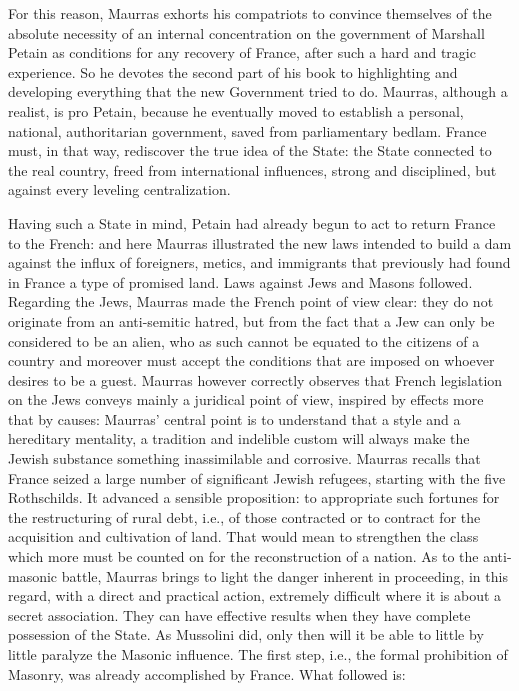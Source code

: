 For this reason, Maurras exhorts his compatriots to convince themselves of the absolute necessity of an internal concentration on the government of Marshall Petain as conditions for any recovery of France, after such a hard and tragic experience. So he devotes the second part of his book to highlighting and developing everything that the new Government tried to do. Maurras, although a realist, is pro Petain, because he eventually moved to establish a personal, national, authoritarian government, saved from parliamentary bedlam. France must, in that way, rediscover the true idea of the State: the State connected to the real country, freed from international influences, strong and disciplined, but against every leveling centralization.

Having such a State in mind, Petain had already begun to act to return France to the French: and here Maurras illustrated the new laws intended to build a dam against the influx of foreigners, metics, and immigrants that previously had found in France a type of promised land. Laws against Jews and Masons followed. Regarding the Jews, Maurras made the French point of view clear: they do not originate from an anti-semitic hatred, but from the fact that a Jew can only be considered to be an alien, who as such cannot be equated to the citizens of a country and moreover must accept the conditions that are imposed on whoever desires to be a guest. Maurras however correctly observes that French legislation on the Jews conveys mainly a juridical point of view, inspired by effects more that by causes: Maurras' central point is to understand that a style and a hereditary mentality, a tradition and indelible custom will always make the Jewish substance something inassimilable and corrosive. Maurras recalls that France seized a large number of significant Jewish refugees, starting with the five Rothschilds. It advanced a sensible proposition: to appropriate such fortunes for the restructuring of rural debt, i.e., of those contracted or to contract for the acquisition and cultivation of land. That would mean to strengthen the class which more must be counted on for the reconstruction of a nation. As to the anti-masonic battle, Maurras brings to light the danger inherent in proceeding, in this regard, with a direct and practical action, extremely difficult where it is about a secret association. They can have effective results when they have complete possession of the State. As Mussolini did, only then will it be able to little by little paralyze the Masonic influence. The first step, i.e., the formal prohibition of Masonry, was already accomplished by France. What followed is:

